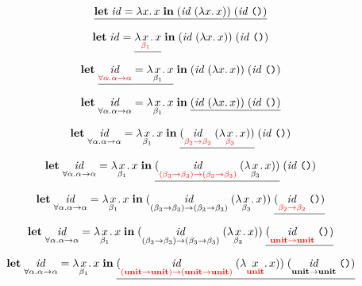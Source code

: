\documentclass[12pt]{article}
\begin{document}
\pagestyle{empty}

\[
    \underline{\mathbf{let}\;\mathit{id} = \lambda x\ldotp x\; \mathbf{in}\; (\mathit{id}\;(\lambda x\ldotp x))\;(\mathit{id}\;\text{\texttt{()}})}
\]

\[
    \mathbf{let}\;\mathit{id} = \underline{\lambda \underset{\color{red} \beta_1}{x}\ldotp x}\; \mathbf{in}\; (\mathit{id}\;(\lambda x\ldotp x))\;(\mathit{id}\;\text{\texttt{()}})
\]

\[
    \mathbf{let}\;\underline{\underset{\color{red} \forall \alpha\ldotp \alpha \to \alpha}{\mathit{id}} = \lambda \underset{\beta_1}{x}\ldotp x}\; \mathbf{in}\; (\mathit{id}\;(\lambda x\ldotp x))\;(\mathit{id}\;\text{\texttt{()}})
\]

\[
    \mathbf{let}\;\underset{\forall \alpha\ldotp \alpha \to \alpha}{\mathit{id}} = \lambda \underset{\beta_1}{x}\ldotp x\; \mathbf{in}\; \underline{(\mathit{id}\;(\lambda x\ldotp x))\;(\mathit{id}\;\text{\texttt{()}})}
\]

\[
    \mathbf{let}\;\underset{\forall \alpha\ldotp \alpha \to \alpha}{\mathit{id}} = \lambda \underset{\beta_1}{x}\ldotp x\; \mathbf{in}\; \underline{(\underset{\color{red} \beta_2 \to \beta_2}{\mathit{id}}\;(\lambda \underset{\color{red} \beta_3}{x}\ldotp x))}\;(\mathit{id}\;\text{\texttt{()}})
\]

\[
    \mathbf{let}\;\underset{\forall \alpha\ldotp \alpha \to \alpha}{\mathit{id}} = \lambda \underset{\beta_1}{x}\ldotp x\; \mathbf{in}\; \underline{(\underset{\color{red} (\beta_3 \to \beta_3) \to (\beta_3 \to \beta_3)}{\mathit{id}}\;(\lambda \underset{\beta_3}{x}\ldotp x))}\;(\mathit{id}\;\text{\texttt{()}})
\]

\[
    \mathbf{let}\;\underset{\forall \alpha\ldotp \alpha \to \alpha}{\mathit{id}} = \lambda \underset{\beta_1}{x}\ldotp x\; \mathbf{in}\; (\underset{(\beta_3 \to \beta_3) \to (\beta_3 \to \beta_3)}{\mathit{id}}\;(\lambda \underset{\beta_3}{x}\ldotp x))\;\underline{(\underset{\color{red} \beta_2 \to \beta_2}{\mathit{id}}\;\text{\texttt{()}})}
\]

\[
    \mathbf{let}\;\underset{\forall \alpha\ldotp \alpha \to \alpha}{\mathit{id}} = \lambda \underset{\beta_1}{x}\ldotp x\; \mathbf{in}\; (\underset{(\beta_3 \to \beta_3) \to (\beta_3 \to \beta_3)}{\mathit{id}}\;(\lambda \underset{\beta_3}{x}\ldotp x))\;\underline{(\underset{\color{red} \mathbf{unit} \to \mathbf{unit}}{\mathit{id}}\;\text{\texttt{()}})}
\]

\[
    \mathbf{let}\;\underset{\forall \alpha\ldotp \alpha \to \alpha}{\mathit{id}} = \lambda \underset{\beta_1}{x}\ldotp x\; \mathbf{in}\; \underline{(\underset{\color{red} (\mathbf{unit} \to \mathbf{unit}) \to (\mathbf{unit} \to \mathbf{unit})}{\mathit{id}}\;(\lambda \underset{\color{red} \mathbf{unit}}{x}\ldotp x))\;(\underset{\mathbf{unit} \to \mathbf{unit}}{\mathit{id}}\;\text{\texttt{()}})}
\]
\end{document}
